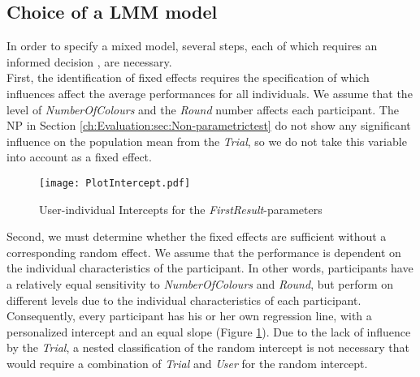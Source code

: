 \subsection{Choice of a \ac{LMM} model}
In order to specify a mixed model, several steps, each of which requires an informed decision \citep{Seltman2012}, are necessary. \\
First, the identification of  fixed effects requires the specification of which influences affect the average performances for all individuals.  We assume that the level of \textit{NumberOfColours} and the \textit{Round} number affects each participant.
The \acl{NP} in Section \ref{ch:Evaluation:sec:Non-parametrictest} do not show any significant influence on the population mean from the \textit{Trial}, so we do not take this variable into account as a fixed effect.\\
\begin{figure}[htbp] %
\begin{center} 
\texttt{[image: PlotIntercept.pdf]}
  \caption{User-individual Intercepts for the \textit{FirstResult}-parameters}
    \label{fig:Intercepts} 
\end{center}
\end{figure}
Second, we must determine whether the fixed effects are sufficient without a corresponding random effect. We assume that the performance is dependent on the individual characteristics of the participant. In other words, participants have a relatively equal sensitivity to \textit{NumberOfColours} and \textit{Round}, but perform on different levels due to the individual characteristics of each participant. Consequently, every participant has his or her own regression line, with a personalized intercept and an equal slope (Figure \ref{fig:Intercepts}). Due to the lack of influence by the \textit{Trial}, a nested classification of the random intercept is not necessary that would require a combination of \textit{Trial} and \textit{User} for the random intercept.\\
